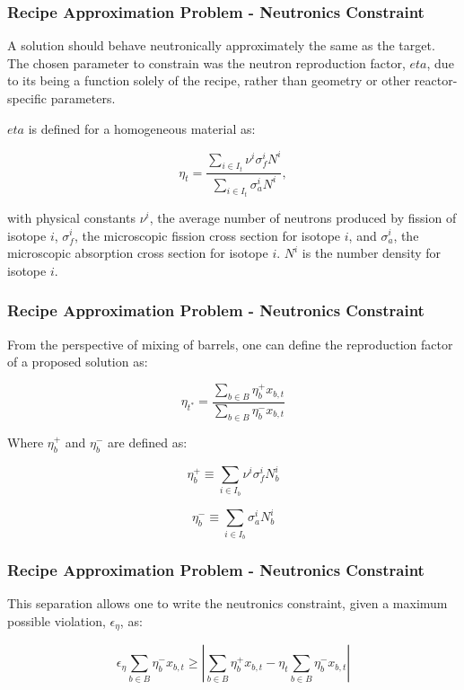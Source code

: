 \begin{frame}[ctb!]
  \frametitle{Recipe Approximation Problem - Neutronics Constraint}

  A solution should behave neutronically approximately the same as the
  target. The chosen parameter to constrain was the neutron reproduction factor,
  $eta$, due to its being a function solely of the recipe, rather than geometry
  or other reactor-specific parameters.

  $eta$ is defined for a homogeneous material as:

  \begin{equation}
    \label{eqs:eta_micro}
    \eta_t = \frac{\sum_{i \in I_t} \nu^{i} \sigma_{f}^{i} N^{i}}
        {\sum_{i \in I_t} \sigma_{a}^{i} N^{i}},
  \end{equation}

  with physical constants $\nu^{i}$, the average number of neutrons produced by
  fission of isotope $i$, $\sigma_{f}^{i}$, the microscopic fission cross
  section for isotope $i$, and $\sigma_{a}^{i}$, the microscopic absorption
  cross section for isotope $i$. $N^i$ is the number density for isotope $i$.
\end{frame}

\begin{frame}[ctb!]
  \frametitle{Recipe Approximation Problem - Neutronics Constraint}

  From the perspective of mixing of barrels, one can define the reproduction
  factor of a proposed solution as:

  \begin{equation}
    \label{eqs:eta_simple}
    \eta_{t^*} = \frac{\sum_{b \in B} \eta_{b}^{+} x_{b, t}}
        {\sum_{b \in B} \eta_{b}^{-} x_{b, t}}
  \end{equation}

  Where $\eta_b^+$ and $\eta_b^-$ are defined as:

  \begin{equation}
    \label{eqs:eta_+}
    \eta_{b}^{+} \equiv \sum_{i \in I_{b}} \nu^{i} \sigma_{f}^{i} N_{b}^{i}
  \end{equation}

  \begin{equation}
    \label{eqs:eta_-}
    \eta_{b}^{-} \equiv \sum_{i \in I_{b}} \sigma_{a}^{i} N_{b}^{i}
  \end{equation}
  
\end{frame}

\begin{frame}[ctb!]
  \frametitle{Recipe Approximation Problem - Neutronics Constraint} 

  This separation allows one to write the neutronics constraint, given a maximum
  possible violation, $\epsilon_{\eta}$, as:

  \begin{equation}
    \label{eqs:eta_linear}
    \epsilon_{\eta} \sum_{b \in B} \eta_{b}^{-} x_{b,t} \geq
    \left| \sum_{b \in B} \eta_{b}^{+} x_{b,t}
    - \eta_{t} \sum_{b \in B} \eta_{b}^{-} x_{b,t} \right|
  \end{equation}  
\end{frame}

